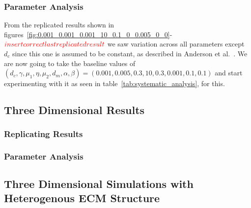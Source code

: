 \subsubsection{Parameter Analysis}
From the replicated results shown in figures~\ref{fig:0.001_0.001_0.001_10_0.1_0_0.005_0_0}-$\textcolor{red}{insert correct last replicated result}$ we saw variation across all parameters except $d_c$ since this one is assumed to be constant, as described in Anderson et al.~\cite{anderson_mathematical_2000}. We are now going to take the baseline values of $(d_c, \gamma, \mu_1, \eta, \mu_2, d_m, \alpha, \beta) = (0.001, 0.005, 0.3, 10, 0.3, 0.001,0.1, 0.1)$ and start experimenting with it as seen in table~\ref{tab:systematic_analysis}, for this.
\subsection{Three Dimensional Results}
\subsubsection{Replicating Results}
\subsubsection{Parameter Analysis}
\subsection{Three Dimensional Simulations with Heterogenous ECM Structure}